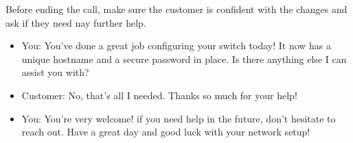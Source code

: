 \documentclass[a4paper,11pt]{article}
\begin{document}
\begin{tcolorbox}[colframe=blue!80, colback=blue!20, coltitle=black, title= Scenario:Closing with Reassurance and follow-up]
      Before ending the call, make sure the customer is confident with the changes and ask if they need nay further  help.\\
    \begin{itemize}
        \item  You: You've done a great job configuring your switch today! It now has a unique hostname and a secure password in place. Is there anything else I can assist you with?\\
        \item Customer: No, that's all I needed. Thanks so much for your help!\\
        \item You: You're very welcome! if you need help in the future, don't hesitate to reach out. Have a great day and good luck with your network setup!\\
    \end{itemize}
\end{tcolorbox}
\end{document}
